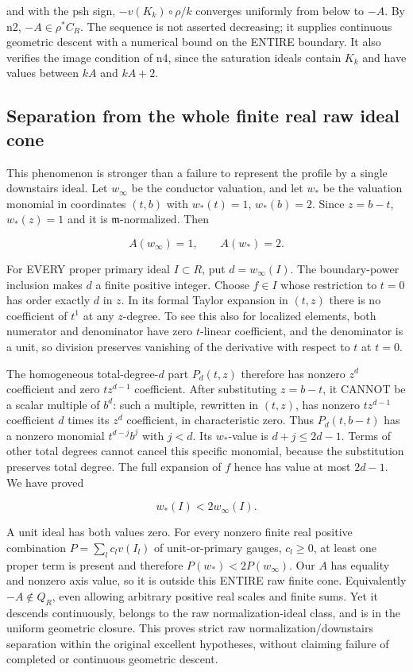 \documentclass[11pt]{article}
\begin{document}
and with the psh sign, $-v(K_k)\circ\rho/k$ converges uniformly from below to $-A$. By n2, $-A\in\rho^*C_R$. The sequence is not asserted decreasing; it supplies continuous geometric descent with a numerical bound on the ENTIRE boundary. It also verifies the image condition of n4, since the saturation ideals contain $K_k$ and have values between $kA$ and $kA+2$.

\subsection{Separation from the whole finite real raw ideal cone}

This phenomenon is stronger than a failure to represent the profile by a single downstairs ideal. Let $w_\infty$ be the conductor valuation, and let $w_*$ be the valuation monomial in coordinates $(t,b)$ with $w_*(t)=1$, $w_*(b)=2$. Since $z=b-t$, $w_*(z)=1$ and it is $\mathfrak m$-normalized. Then

\[
A(w_\infty)=1,\qquad A(w_*)=2.
\]

For EVERY proper primary ideal $I\subset R$, put $d=w_\infty(I)$. The boundary-power inclusion makes $d$ a finite positive integer. Choose $f\in I$ whose restriction to $t=0$ has order exactly $d$ in $z$. In its formal Taylor expansion in $(t,z)$ there is no coefficient of $t^1$ at any $z$-degree. To see this also for localized elements, both numerator and denominator have zero $t$-linear coefficient, and the denominator is a unit, so division preserves vanishing of the derivative with respect to $t$ at $t=0$.

The homogeneous total-degree-$d$ part $P_d(t,z)$ therefore has nonzero $z^d$ coefficient and zero $t z^{d-1}$ coefficient. After substituting $z=b-t$, it CANNOT be a scalar multiple of $b^d$: such a multiple, rewritten in $(t,z)$, has nonzero $t z^{d-1}$ coefficient $d$ times its $z^d$ coefficient, in characteristic zero. Thus $P_d(t,b-t)$ has a nonzero monomial $t^{d-j}b^j$ with $j<d$. Its $w_*$-value is $d+j\le2d-1$. Terms of other total degrees cannot cancel this specific monomial, because the substitution preserves total degree. The full expansion of $f$ hence has value at most $2d-1$. We have proved

\[
w_*(I)<2w_\infty(I).
\]

A unit ideal has both values zero. For every nonzero finite real positive combination $P=\sum_l c_l v(I_l)$ of unit-or-primary gauges, $c_l\ge0$, at least one proper term is present and therefore $P(w_*)<2P(w_\infty)$. Our $A$ has equality and nonzero axis value, so it is outside this ENTIRE raw finite cone. Equivalently $-A\notin Q_R$, even allowing arbitrary positive real scales and finite sums. Yet it descends continuously, belongs to the raw normalization-ideal class, and is in the uniform geometric closure. This proves strict raw normalization/downstairs separation within the original excellent hypotheses, without claiming failure of completed or continuous geometric descent.
\end{document}
